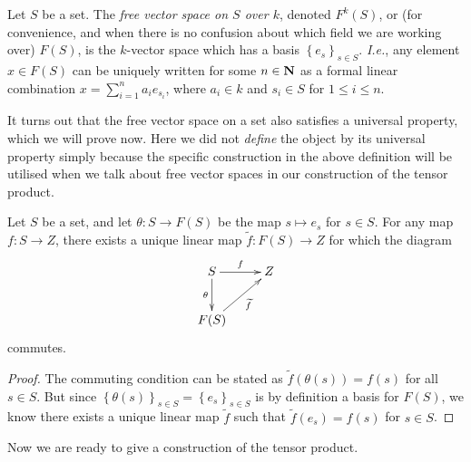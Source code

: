 \begin{dfn}
  Let $S$ be a set. The \emph{free vector space on $S$ over $k$},
  denoted $F^k(S)$, or (for convenience, and when there is no
  confusion about which field we are working over) $F(S)$, is the
  $k$-vector space which has a basis $\left\{e_s\right\}_{s \in
    S}$. \emph{I.e.}, any element $x \in F(S)$ can be uniquely written
  for some $n \in \boldsymbol{\mathbf{N}}$ as a formal linear combination $x = \sum_{i=1}^n
  a_ie_{s_i}$, where $a_i \in k$ and $s_i \in S$ for $1 \le i \le n$.
\end{dfn}

It turns out that the free vector space on a set also satisfies a
universal property, which we will prove now. Here we did not
\emph{define} the object by its universal property simply because the
specific construction in the above definition will be utilised when we
talk about free vector spaces in our construction of the tensor
product.

\begin{pro} \label{freeuniv} Let $S$ be a set, and let $\theta : S \to
  F(S)$ be the map $s \mapsto e_s$ for $s \in S$. For any map $f : S
  \to Z$, there exists a unique linear map $\tilde f : F(S) \to Z$ for
  which the diagram
  \[ \xymatrix{ S \ar[r]^-f \ar[d]_-{\theta} & Z \\ F(S)
    \ar[ur]_-{\tilde f} } \] commutes.
  \begin{proof}
    The commuting condition can be stated as $\tilde f(\theta(s)) =
    f(s)$ for all $s \in S$. But since $\left\{\theta(s)\right\}_{s
      \in S} = \left\{e_s\right\}_{s \in S}$ is by definition a basis
    for $F(S)$, we know there exists a unique linear map $\tilde f$
    such that $\tilde f(e_s) = f(s)$ for $s \in S$.
  \end{proof}
\end{pro}

Now we are ready to give a construction of the tensor product.

